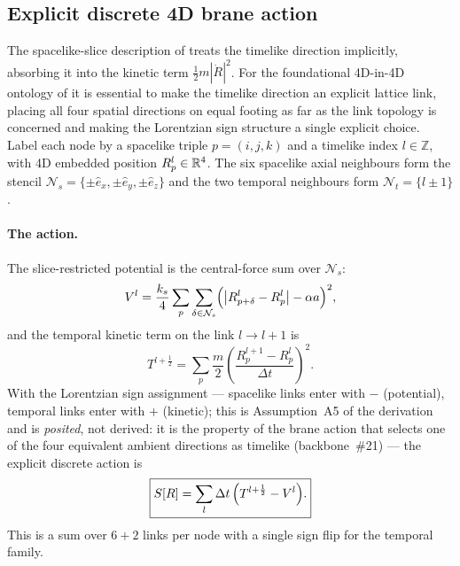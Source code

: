 \subsection{Explicit discrete 4D brane action}
\label{subsec:discrete-4d-action}

The spacelike-slice description of  treats the timelike direction implicitly, absorbing it into the kinetic term $\tfrac12 m |\dot{R}|^2$.
For the foundational 4D-in-4D ontology of  it is essential to make the timelike direction an explicit lattice link, placing all four spatial directions on equal footing as far as the link topology is concerned and making the Lorentzian sign structure a single explicit choice.
Label each node by a spacelike triple $p=(i,j,k)$ and a timelike index $l\in\mathbb{Z}$, with 4D embedded position $R_p^l\in\mathbb{R}^4$.
The six spacelike axial neighbours form the stencil $\mathcal{N}_s=\{\pm\hat{e}_x,\pm\hat{e}_y,\pm\hat{e}_z\}$ and the two temporal neighbours form $\mathcal{N}_t=\{l\pm 1\}$.

\paragraph{The action.}
The slice-restricted potential is the central-force sum over $\mathcal{N}_s$:
\begin{equation}
  V^l = \frac{k_s}{4}\sum_{p}\sum_{\delta\in\mathcal{N}_s}
        \Bigl(\bigl|R_{p+\delta}^l - R_p^l\bigr| - \alpha a\Bigr)^2,
  \label{eq:slice-potential}
\end{equation}
and the temporal kinetic term on the link $l\to l+1$ is
\begin{equation}
  T^{l+\frac{1}{2}} = \sum_{p}\frac{m}{2}
        \left(\frac{R_p^{l+1}-R_p^l}{\Delta t}\right)^{\!2}.
  \label{eq:temporal-kinetic}
\end{equation}
With the Lorentzian sign assignment --- spacelike links enter with $-$ (potential), temporal links enter with $+$ (kinetic); this is Assumption~A5 of the derivation and is \emph{posited}, not derived: it is the property of the brane action that selects one of the four equivalent ambient directions as timelike (backbone~\#21) --- the explicit discrete action is
\begin{equation}
  \boxed{
  S[R] = \sum_l \Delta t\,\Bigl(T^{l+\frac{1}{2}} - V^l\Bigr).
  }
  \label{eq:discrete-4d-action}
\end{equation}
This is a sum over $6+2$ links per node with a single sign flip for the temporal family.

